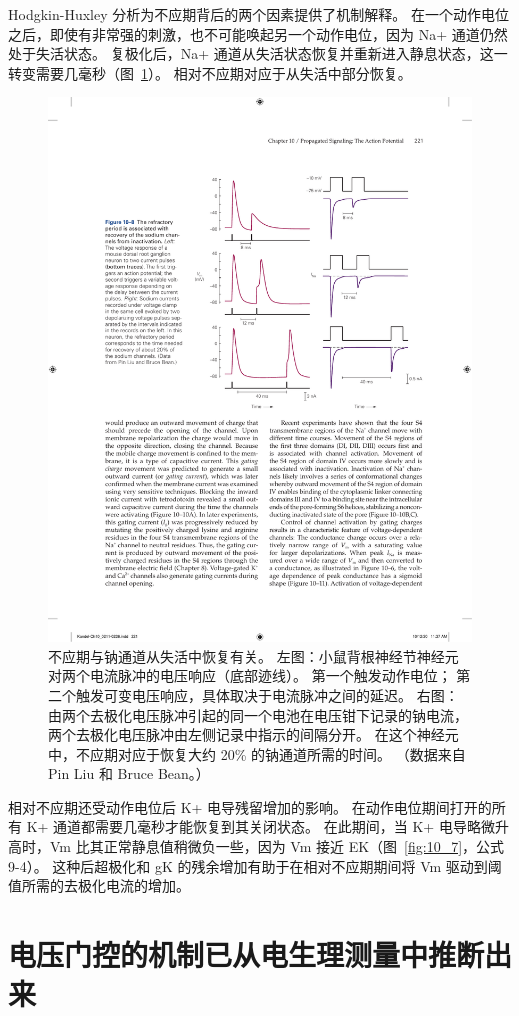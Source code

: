 Hodgkin-Huxley 分析为不应期背后的两个因素提供了机制解释。
在一个动作电位之后，即使有非常强的刺激，也不可能唤起另一个动作电位，因为 Na+ 通道仍然处于失活状态。 
复极化后，Na+ 通道从失活状态恢复并重新进入静息状态，这一转变需要几毫秒（图~\ref{fig:10_8}）。 
相对不应期对应于从失活中部分恢复。


\begin{figure}[htbp]
	\centering
	\includegraphics[width=0.7\linewidth]{chap10/fig_10_8}
	\caption{不应期与钠通道从失活中恢复有关。 左图：小鼠背根神经节神经元对两个电流脉冲的电压响应（底部迹线）。 第一个触发动作电位； 第二个触发可变电压响应，具体取决于电流脉冲之间的延迟。 右图：由两个去极化电压脉冲引起的同一个电池在电压钳下记录的钠电流，两个去极化电压脉冲由左侧记录中指示的间隔分开。 在这个神经元中，不应期对应于恢复大约 20\% 的钠通道所需的时间。 （数据来自 Pin Liu 和 Bruce Bean。）}
	\label{fig:10_8}
\end{figure}


相对不应期还受动作电位后 K+ 电导残留增加的影响。 
在动作电位期间打开的所有 K+ 通道都需要几毫秒才能恢复到其关闭状态。
在此期间，当 K+ 电导略微升高时，Vm 比其正常静息值稍微负一些，因为 Vm 接近 EK（图~\ref{fig:10_7}，公式 9-4）。 
这种后超极化和 gK 的残余增加有助于在相对不应期期间将 Vm 驱动到阈值所需的去极化电流的增加。




\section{电压门控的机制已从电生理测量中推断出来}

